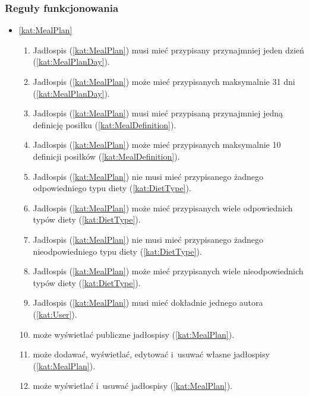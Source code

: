 \subsubsection{Reguły funkcjonowania}\label{subsubsec:database:mealplans:functionalRules}

\begin{itemize}[label={\textbf{Reguły dla}}, wide, labelwidth=!, labelindent=0pt]
    \setlength\itemsep{1.75em}
    \item\ref{kat:MealPlan}\mynobreakpar
    \begin{enumerate}[label={\textbf{REG/4/\protect\twodigits{\arabic{enumi}}}}, wide, labelwidth=!, align=left, leftmargin=3cm]
        \item Jadłospis (\ref{kat:MealPlan}) musi mieć przypisany przynajmniej jeden dzień (\ref{kat:MealPlanDay}).
        \item Jadłospis (\ref{kat:MealPlan}) może mieć przypisanych maksymalnie 31 dni (\ref{kat:MealPlanDay}).
        \item Jadłospis (\ref{kat:MealPlan}) musi mieć przypisaną przynajmniej jedną definicję posiłku (\ref{kat:MealDefinition}).
        \item Jadłospis (\ref{kat:MealPlan}) może mieć przypisanych maksymalnie 10 definicji posiłków (\ref{kat:MealDefinition}).
        \item Jadłospis (\ref{kat:MealPlan}) nie musi mieć przypisanego żadnego odpowiedniego typu diety (\ref{kat:DietType}).
        \item Jadłospis (\ref{kat:MealPlan}) może mieć przypisanych wiele odpowiednich typów diety (\ref{kat:DietType}).
        \item Jadłospis (\ref{kat:MealPlan}) nie musi mieć przypisanego żadnego nieodpowiedniego typu diety (\ref{kat:DietType}).
        \item Jadłospis (\ref{kat:MealPlan}) może mieć przypisanych wiele nieodpowiednich typów diety (\ref{kat:DietType}).
        \item Jadłospis (\ref{kat:MealPlan}) musi mieć dokładnie jednego autora (\ref{kat:User}).
        \item {} może wyświetlać publiczne jadłospisy (\ref{kat:MealPlan}).
        \item {} może dodawać, wyświetlać, edytować i~usuwać własne jadłospisy (\ref{kat:MealPlan}).
        \item {} może wyświetlać i~usuwać jadłospisy (\ref{kat:MealPlan}).
    \end{enumerate}

\end{itemize}
